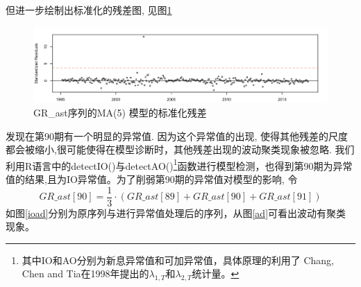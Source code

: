 但进一步绘制出标准化的残差图, 见图\ref{fig:srgrast}
\begin{figure}
	\centering
	\includegraphics[width=0.8\linewidth]{pic/ast/srgr_ast}
	\caption{GR\_ast序列的MA(5) 模型的标准化残差}
	\label{fig:srgrast}
\end{figure}
发现在第90期有一个明显的异常值. 因为这个异常值的出现, 使得其他残差的尺度都会被缩小,很可能使得在模型诊断时，其他残差出现的波动聚类现象被忽略. 我们利用R语言中的detectIO()与detectAO()\footnote{其中IO和AO分别为新息异常值和可加异常值，具体原理的利用了 Chang, Chen and Tia在1998年提出的$\lambda_{1,T}$和$\lambda_{2,T}$统计量。}函数进行模型检测，也得到第90期为异常值的结果,且为IO异常值。为了削弱第90期的异常值对模型的影响, 令
\begin{equation}
GR\_ast[90] = \frac{1}{3} \cdot (GR\_ast[89]+GR\_ast[90]+GR\_ast[91])
\end{equation}
如图\ref{ioad}分别为原序列与进行异常值处理后的序列，从图\ref{ad}可看出波动有聚类现象。
